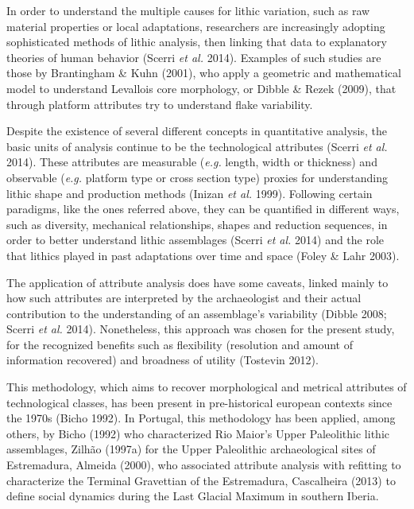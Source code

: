 \documentclass[12pt,twoside]{reedthesis}
\begin{document}
In order to understand the multiple causes for lithic variation, such as raw material properties or local adaptations, researchers are increasingly adopting sophisticated methods of lithic analysis, then linking that data to explanatory theories of human behavior (Scerri \emph{et al.} 2014). Examples of such studies are those by Brantingham \& Kuhn (2001), who apply a geometric and mathematical model to understand Levallois core morphology, or Dibble \& Rezek (2009), that through platform attributes try to understand flake variability.

Despite the existence of several different concepts in quantitative analysis, the basic units of analysis continue to be the technological attributes (Scerri \emph{et al.} 2014). These attributes are measurable (\emph{e.g.} length, width or thickness) and observable (\emph{e.g.} platform type or cross section type) proxies for understanding lithic shape and production methods (Inizan \emph{et al.} 1999). Following certain paradigms, like the ones referred above, they can be quantified in different ways, such as diversity, mechanical relationships, shapes and reduction sequences, in order to better understand lithic assemblages (Scerri \emph{et al.} 2014) and the role that lithics played in past adaptations over time and space (Foley \& Lahr 2003).

The application of attribute analysis does have some caveats, linked mainly to how such attributes are interpreted by the archaeologist and their actual contribution to the understanding of an assemblage's variability (Dibble 2008; Scerri \emph{et al.} 2014). Nonetheless, this approach was chosen for the present study, for the recognized benefits such as flexibility (resolution and amount of information recovered) and broadness of utility (Tostevin 2012).

This methodology, which aims to recover morphological and metrical attributes of technological classes, has been present in pre-historical european contexts since the 1970s (Bicho 1992). In Portugal, this methodology has been applied, among others, by Bicho (1992) who characterized Rio Maior's Upper Paleolithic lithic assemblages, Zilhão (1997a) for the Upper Paleolithic archaeological sites of Estremadura, Almeida (2000), who associated attribute analysis with refitting to characterize the Terminal Gravettian of the Estremadura, Cascalheira (2013) to define social dynamics during the Last Glacial Maximum in southern Iberia.
\end{document}
